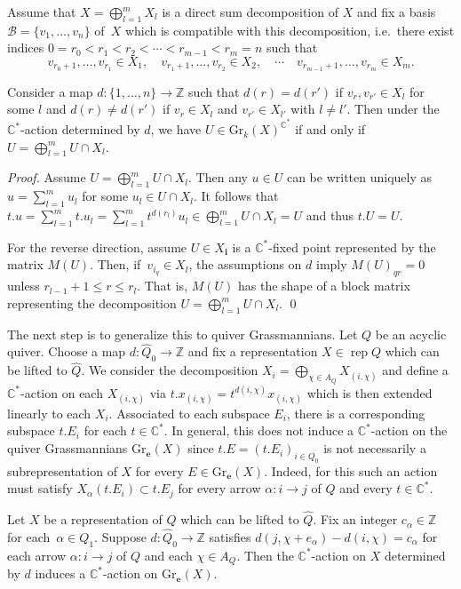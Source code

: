 \documentclass[smallextended,envcountsect,envcountsame]{svjour3}
\numberwithin{equation}{section}
\newcommand{\C}{\mathbb{C}}
\newcommand{\CC}{\mathbb{C}}
\newcommand{\ZZ}{\mathbb{Z}}
\newcommand{\bfe}{\mathbf{e}}
\newcommand{\bfi}{\mathbf{i}}
\newcommand{\Gr}{\mathrm{Gr}}
\newcommand{\rep}{\operatorname{rep}}
\begin{document}
Assume that $X=\bigoplus_{l=1}^m X_l$ is a direct sum decomposition of $X$ and fix a basis $\mathcal B=\{v_1,\ldots,v_n\}$ of~$X$ which is compatible with this decomposition, i.e.\ there exist indices $0=r_0<r_1<r_2<\cdots<r_{m-1}<r_m=n$ such that
\[v_{r_0+1},\ldots,v_{r_1}\in X_1,\quad v_{r_1+1},\ldots,v_{r_2}\in X_2,\quad\cdots\quad v_{r_{m-1}+1},\ldots,v_{r_m}\in X_m.\]
\begin{lemma}
  \label{le:usualGrass}
  Consider a map $d:\{1,\ldots,n\}\to\ZZ$ such that $d(r)=d(r')$ if $v_r,v_{r'}\in X_l$ for some $l$ and $d(r)\neq d(r')$ if $v_r\in X_l$ and $v_{r'}\in X_{l'}$ with $l\neq l'$.
  Then under the $\CC^*$-action determined by $d$, we have $U\in\Gr_k(X)^{\C^\ast}$ if and only if $U=\bigoplus_{l=1}^m U\cap X_l$.
\end{lemma}
\begin{proof}
  Assume $U=\bigoplus_{l=1}^m U\cap X_l$.
  Then any $u\in U$ can be written uniquely as $u=\sum_{l=1}^m u_l$ for some $u_l\in U\cap X_l$.
  It follows that $t.u=\sum_{l=1}^m t.u_l=\sum_{l=1}^m t^{d(r_l)}u_l\in\bigoplus_{l=1}^m U\cap X_l=U$ and thus $t.U=U$. 

  For the reverse direction, assume $U\in X_{\bfi}$ is a $\CC^*$-fixed point represented by the matrix $M(U)$.
  Then, if~$v_{i_q}\in X_l$, the assumptions on $d$ imply $M(U)_{qr}=0$ unless $r_{l-1}+1\le r\le r_l$.
  That is, $M(U)$ has the shape of a block matrix representing the decomposition $U=\bigoplus_{l=1}^m U\cap X_l$.
\qed\end{proof}
The next step is to generalize this to quiver Grassmannians.
Let $Q$ be an acyclic quiver.
Choose a map $d:\hat Q_0\to\ZZ$ and fix a representation $X\in\rep Q$ which can be lifted to $\hat Q$.
We consider the decomposition $X_i=\bigoplus_{\chi\in A_Q} X_{(i,\chi)}$ and define a $\CC^*$-action on each $X_{(i,\chi)}$ via $t.x_{(i,\chi)}=t^{d(i,\chi)}x_{(i,\chi)}$ which is then extended linearly to each $X_i$.
Associated to each subspace $E_i$, there is a corresponding subspace $t.E_i$ for each $t\in\CC^*$.
In general, this does not induce a $\CC^*$-action on the quiver Grassmannians $\Gr_\bfe(X)$ since $t.E=(t.E_i)_{i\in Q_0}$ is not necessarily a subrepresentation of $X$ for every $E\in\Gr_\bfe(X)$.
Indeed, for this such an action must satisfy $X_\alpha(t.E_i)\subset t.E_j$ for every arrow $\alpha:i\to j$ of $Q$ and every $t\in\CC^*$. 
\begin{lemma}
  Let $X$ be a representation of $Q$ which can be lifted to $\hat Q$.
  Fix an integer $c_\alpha\in\ZZ$ for each~$\alpha\in Q_1$.
  Suppose $d:\hat Q_0\to\ZZ$ satisfies $d(j,\chi+e_\alpha)-d(i,\chi)=c_\alpha$ for each arrow $\alpha:i\to j$ of $Q$ and each $\chi\in A_Q$.
  Then the $\CC^*$-action on $X$ determined by $d$ induces a $\CC^*$-action on $\Gr_\bfe(X)$.
\end{lemma}
\end{document}
